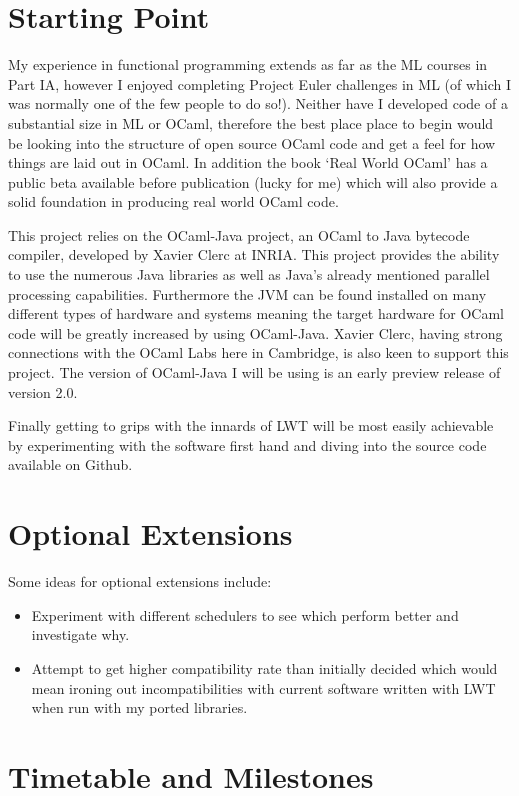 \documentclass[a4paper]{article}
\begin{document}
\section{Starting Point}
\label{sec:starting}
My experience in functional programming extends as far as the ML courses in Part IA, however I enjoyed completing Project Euler challenges in ML (of which I was normally one of the few people to do so!). Neither have I developed code of a substantial size in ML or OCaml, therefore the best place place to begin would be looking into the structure of open source OCaml code and get a feel for how things are laid out in OCaml. In addition the book `Real World OCaml'\cite{madhavapeddy2013} has a public beta available before publication (lucky for me) which will also provide a solid foundation in producing real world OCaml code.

This project relies on the OCaml-Java project, an OCaml to Java bytecode compiler, developed by Xavier Clerc at INRIA. This project provides the ability to use the numerous Java libraries as well as Java's already mentioned parallel processing capabilities. Furthermore the JVM can be found installed on many different types of hardware and systems meaning the target hardware for OCaml code will be greatly increased by using OCaml-Java. Xavier Clerc, having strong connections with the OCaml Labs here in Cambridge, is also keen to support this project. The version of OCaml-Java I will be using is an early preview release of version 2.0.

Finally getting to grips with the innards of LWT will be most easily achievable by experimenting with the software first hand and diving into the source code available on Github.

\section{Optional Extensions}
\label{sec:optional}
Some ideas for optional extensions include:
\begin{itemize}
\item{Experiment with different schedulers to see which perform better and investigate why.}
\item{Attempt to get higher compatibility rate than initially decided which would mean ironing out incompatibilities with current software written with LWT when run with my ported libraries.}
\end{itemize}

\section{Timetable and Milestones}
\label{sec:timetable}
\end{document}
